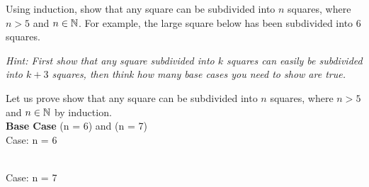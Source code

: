 \documentclass[solution,letterpaper]{cs20}
\begin{document}
    \begin{problem}
        Using induction, show that any square can be subdivided into $n$ squares, where $n > 5$ and $n \in \mathbb{N}$. For example, the large square below has been subdivided into 6 squares.

        \begin{center}
        \end{center}

        \textit{Hint: First show that any square subdivided into $k$ squares can easily be subdivided into $k+3$ squares, then think how many base cases you need to show are true.}

        \begin{solution}
            Let us prove show that any square can be subdivided into $n$ squares, where $n > 5$ and $n \in \mathbb{N}$ by induction. \\

            \textbf{Base Case} (n = 6) and (n = 7) \\

            Case: n = 6  \\
             \\

            Case: n = 7 \\
             \\


\end{solution}
\end{problem}
\end{document}
